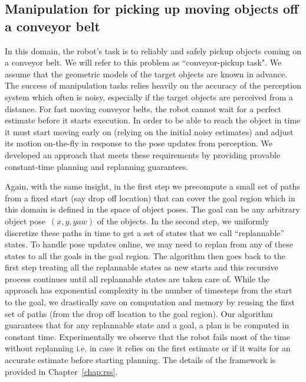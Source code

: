 \documentclass[a4paper]{report}
\begin{document}
\subsection{Manipulation for picking up moving objects off a conveyor belt}
In this domain, the robot's task is to reliably and safely pickup objects coming on a conveyor belt. We will refer to this problem as ``conveyor-pickup task". We assume that the geometric models of the target objects are known in advance. The success of manipulation tasks relies heavily on the accuracy of the perception system which often is noisy, especially if the target objects are perceived from a distance. For fast moving conveyor belts, the robot cannot wait for a perfect estimate before it starts execution. In order to be able to reach the object in time it must start moving early on (relying on the initial noisy estimates) and adjust its motion on-the-fly in response to the pose updates from perception. We developed an approach that meets these requirements by providing provable constant-time planning and replanning guarantees.

Again, with the same insight, in the first step we precompute a small set of paths from a fixed start (say drop off location) that can cover the goal region which in this domain is defined in the space of object poses. The goal can be any arbitrary object pose~$(x,y,yaw)$ of the objects. In the second step, we uniformly discretize these paths in time to get a set of states that we call ``replannable'' states. To handle pose updates online, we may need to replan from any of these states to all the goals in the goal region. The algorithm then goes back to the first step treating all the replannable states as new starts and this recursive process continues until all replannable states are taken care of. While the approach has exponential complexity in the number of timesteps from the start to the goal, we drastically save on computation and memory by reusing the first set of paths (from the drop off location to the goal region). Our algorithm guarantees that for any replannable state and a goal, a plan is be computed in constant time. Experimentally we observe that the robot fails most of the time without replanning i.e. in case it relies on the first estimate or if it waits for an accurate estimate before starting planning. The details of the framework is provided in Chapter~\ref{chap:rss}.
\end{document}
